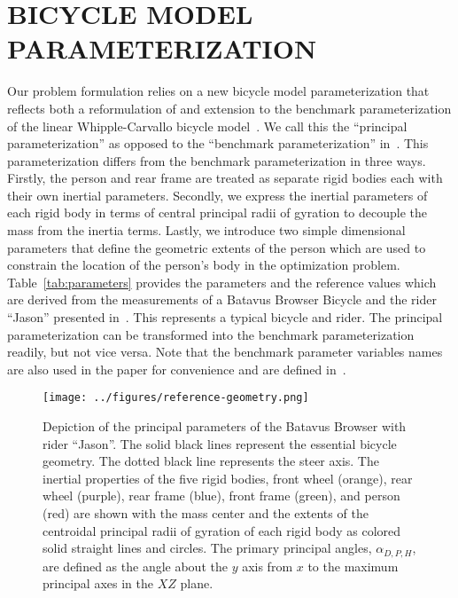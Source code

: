 \documentclass{bmd2019p}
\begin{document}
\section{BICYCLE MODEL PARAMETERIZATION}
%
Our problem formulation relies on a new bicycle model parameterization that
reflects both a reformulation of and extension to the benchmark
parameterization of the linear Whipple-Carvallo bicycle
model~\cite{Meijaard2007}. We call this the ``principal parameterization'' as
opposed to the ``benchmark parameterization'' in~\cite{Meijaard2007}. This
parameterization differs from the benchmark parameterization in three ways.
Firstly, the person and rear frame are treated as separate rigid bodies each
with their own inertial parameters. Secondly, we express the inertial
parameters of each rigid body in terms of central principal radii of gyration
to decouple the mass from the inertia terms. Lastly, we introduce two simple
dimensional parameters that define the geometric extents of the person which
are used to constrain the location of the person's body in the optimization
problem. Table~\ref{tab:parameters} provides the parameters and the reference
values which are derived from the measurements of a Batavus Browser Bicycle and
the rider ``Jason'' presented in~\cite{Moore2012}. This represents a typical
bicycle and rider. The principal parameterization can be transformed into the
benchmark parameterization readily, but not vice versa. Note that the benchmark
parameter variables names are also used in the paper for convenience and are
defined in~\cite{Meijaard2007}.
%
\begin{figure}
  \centering
  \texttt{[image: ../figures/reference-geometry.png]}
  \caption{Depiction of the principal parameters of the Batavus Browser
    with rider ``Jason''. The solid black lines represent the essential bicycle
    geometry. The dotted black line represents the steer axis. The inertial
    properties of the five rigid bodies, front wheel (orange), rear wheel
    (purple), rear frame (blue), front frame (green), and person (red) are
    shown with the mass center and the extents of the centroidal principal
    radii of gyration of each rigid body as colored solid straight lines and
    circles. The primary principal angles, $\alpha_{D,P,H}$, are defined as the
    angle about the $y$ axis from $x$ to the maximum principal axes in the $XZ$
    plane.}
\end{figure}
%
\end{document}
